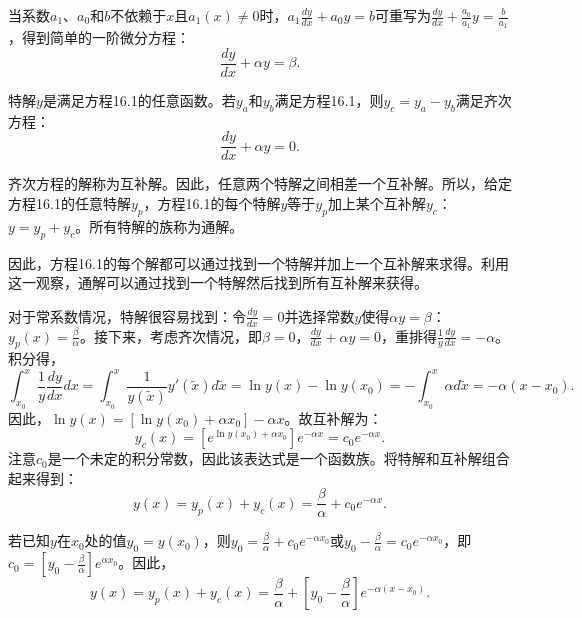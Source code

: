 \begin{translation}
当系数$a_1$、$a_0$和$b$不依赖于$x$且$a_1(x) \neq 0$时，$a_1\frac{dy}{dx} + a_0 y = b$可重写为$\frac{dy}{dx} + \frac{a_0}{a_1}y = \frac{b}{a_1}$，得到简单的一阶微分方程：
\[
\frac{dy}{dx} + \alpha y = \beta. \tag{16.1}
\]

特解$y$是满足方程16.1的任意函数。若$y_a$和$y_b$满足方程16.1，则$y_c = y_a - y_b$满足齐次方程：
\[
\frac{dy}{dx} + \alpha y = 0. \tag{16.2}
\]

齐次方程的解称为互补解。因此，任意两个特解之间相差一个互补解。所以，给定方程16.1的任意特解$y_p$，方程16.1的每个特解$y$等于$y_p$加上某个互补解$y_c$：$y = y_p + y_c$。所有特解的族称为通解。

因此，方程16.1的每个解都可以通过找到一个特解并加上一个互补解来求得。利用这一观察，通解可以通过找到一个特解然后找到所有互补解来获得。

对于常系数情况，特解很容易找到：令$\frac{dy}{dx} = 0$并选择常数$y$使得$\alpha y = \beta$：$y_p(x) = \frac{\beta}{\alpha}$。接下来，考虑齐次情况，即$\beta = 0$，$\frac{dy}{dx} + \alpha y = 0$，重排得$\frac{1}{y}\frac{dy}{dx} = -\alpha$。积分得，
\[
\int_{x_0}^{x} \frac{1}{y}\frac{dy}{dx} dx = \int_{x_0}^{x} \frac{1}{y(\tilde{x})} y'(\tilde{x}) d\tilde{x} = \ln y(x) - \ln y(x_0) = -\int_{x_0}^{x} \alpha d\tilde{x} = -\alpha(x - x_0).
\]
因此，$\ln y(x) = [\ln y(x_0) + \alpha x_0] - \alpha x$。故互补解为：
\[
y_c(x) = [e^{\ln y(x_0)+\alpha x_0}]e^{-\alpha x} = c_0 e^{-\alpha x}.
\]
注意$c_0$是一个未定的积分常数，因此该表达式是一个函数族。将特解和互补解组合起来得到：
\[
y(x) = y_p(x) + y_c(x) = \frac{\beta}{\alpha} + c_0 e^{-\alpha x}. \tag{16.3/16.4}
\]

若已知$y$在$x_0$处的值$y_0 = y(x_0)$，则$y_0 = \frac{\beta}{\alpha} + c_0 e^{-\alpha x_0}$或$y_0 - \frac{\beta}{\alpha} = c_0 e^{-\alpha x_0}$，即$c_0 = [y_0 - \frac{\beta}{\alpha}] e^{\alpha x_0}$。因此，
\[
y(x) = y_p(x) + y_c(x) = \frac{\beta}{\alpha} + \left[y_0 - \frac{\beta}{\alpha}\right] e^{-\alpha(x-x_0)}. \tag{16.5/16.6}
\]
\end{translation}
